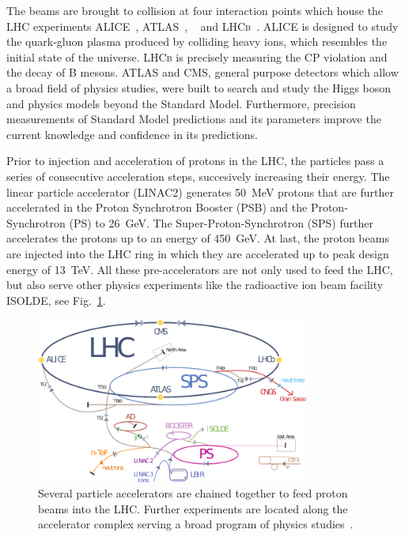 The beams are brought to collision at four interaction points which house the
LHC experiments ALICE~\cite{ALICE}, ATLAS~\cite{ATLASa},
\CMS~\cite{Bayatian:922757,Ball:2007zza,Chatrchyan:2008aa} and
\textsc{LHCb}~\cite{LHCb}. ALICE is designed to study the quark-gluon plasma
produced by colliding heavy ions, which resembles the initial state of the
universe. \textsc{LHCb} is precisely measuring the CP violation and the decay of B
mesons. ATLAS and CMS, general purpose detectors which allow a broad field of
physics studies, were built to search and study the Higgs boson and physics
models beyond the Standard Model. Furthermore, precision measurements of
Standard Model predictions and its parameters improve the current knowledge and
confidence in its predictions.

Prior to injection and acceleration of protons in the LHC, the particles pass a
series of consecutive acceleration steps, succesively increasing their energy.
The linear particle accelerator (LINAC2) generates \SI{50}{\mega \electronvolt}
protons that are further accelerated in the Proton Synchrotron Booster (PSB) and
the Proton-Synchrotron (PS) to \SI{26}{\giga \electronvolt}. The
Super-Proton-Synchrotron (SPS) further accelerates the protons up to an energy
of \SI{450}{\giga \electronvolt}. At last, the proton beams are injected into
the LHC ring in which they are accelerated up to peak design energy of
\SI{13}{\tera\electronvolt}. All these pre-accelerators are not only used to
feed the LHC, but also serve other physics experiments like the radioactive ion
beam facility ISOLDE, see Fig.~\ref{fig:lhc_complex}.

\begin{figure}[htbp]
    \centering
    \includegraphics[width=0.8\textwidth]{figures/cms_detector/lhc_accelerator_chain.pdf}
    \caption[\CERN accelerator complex]{Several particle accelerators are
        chained together to feed proton beams into the LHC. Further experiments are
        located along the accelerator complex serving a broad program of physics
        studies~\cite{LHC:COMPLEX}.}
    \label{fig:lhc_complex}
\end{figure}

